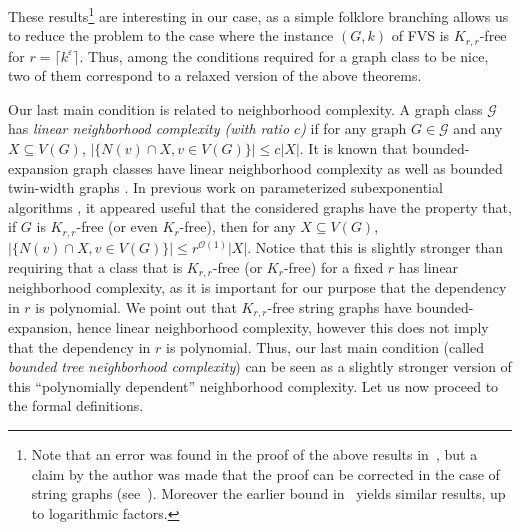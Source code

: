 \documentclass{amsart}
\newcommand{\eps}{\varepsilon}
\newcommand{\FVS}{\textsc{FVS}\xspace}
\renewcommand{\O}{\mathcal{O}}
\begin{document}
These results\footnote{Note that an error was found in the proof of the above results in~\cite{lee2016separators}, but a claim by the author was made that the proof can be corrected in the case of string graphs (see~\cite{Bonnet2024}). Moreover the earlier bound in~\cite{Matousek14} yields similar results, up to logarithmic factors.
} are interesting in our case, as a simple folklore branching allows us to reduce the problem to the case where the instance $(G,k)$ of \FVS is $K_{r,r}$-free for $r=\lceil k^\eps \rceil$.
Thus, among the conditions required for a graph class to be nice,
two of them correspond to a relaxed version of the above theorems.

Our last main condition is related to neighborhood complexity.
A graph class $\mathcal{G}$ has \emph{linear neighborhood complexity (with ratio $c$)} if for any graph $G\in \mathcal{G}$ and any $X \subseteq V(G)$, $|\{N(v) \cap X, v \in V(G)\}| \le c|X|$. 
It is known that bounded-expansion graph classes have linear neighborhood complexity \cite{reidl2019characterising} as well as bounded twin-width graphs \cite{bonnet2024neighbourhood}.
In previous work on parameterized subexponential algorithms \cite{Lokshtanov23Approx,Faster2023Shinwoo,FVS-WG,berthe24ASQGM}, it appeared useful that the considered graphs have the property that,
if $G$ is $K_{r,r}$-free (or even $K_r$-free), then for any $X \subseteq V(G)$, $|\{N(v) \cap X, v \in V(G)\}| \le r^{\O(1)}|X|$.
Notice that this is slightly stronger than requiring that a class that is $K_{r,r}$-free (or $K_r$-free) for a fixed $r$ has linear neighborhood complexity, as it is important for our purpose that the dependency in $r$ is polynomial. 
We point out that $K_{r,r}$-free string graphs have bounded-expansion, hence linear neighborhood complexity, however this does not imply that the dependency in $r$ is polynomial.
Thus, our last main condition (called \emph{bounded tree neighborhood complexity}) can be seen as a slightly stronger version of this ``polynomially dependent'' neighborhood complexity.
Let us now proceed to the formal definitions.
\end{document}
